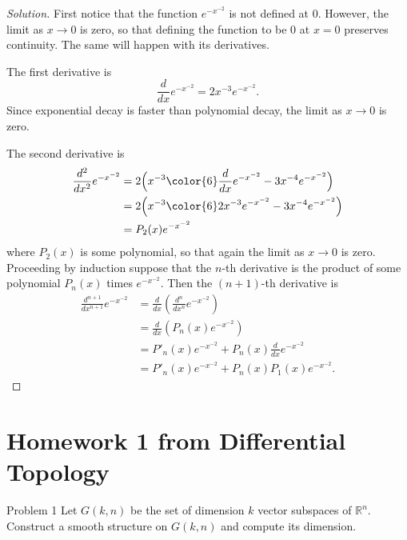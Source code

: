 \begin{proof}[Solution]\leavevmode
	First notice that the function \(e^{-x^{-2}}\) is not defined at 0. However, the limit as \(x \to 0\) is zero, so that defining the function to be 0 at \(x=0\) preserves continuity. The same will happen with its derivatives.

	The first derivative is
	\[\frac{d}{dx}e^{-x^{-2}}=2x^{-3}e^{-x^{-2}}.\]
Since exponential decay is faster than polynomial decay, the limit as \(x \to 0\) is zero.

	The second derivative is
\begin{align*}
	\frac{d^2}{dx^2}e^{-x^{-2}}&=2\Big(x^{-3}{\color{6}\frac{d}{dx}e^{-x^{-2}}}-3x^{-4}e^{-x^{-2}}\Big)\\
&=2\Big(x^{-3}{\color{6}2x^{-3}e^{-x^{-2}}}-3x^{-4}e^{-x^{-2}}\Big)\\
&=P_2(x)e^{-x^{-2}}
\end{align*}
where \(P_2(x)\) is some polynomial, so that again the limit as \(x \to 0\) is zero. Proceeding by induction suppose that the \(n\)-th derivative is the product of some polynomial \(P_n(x)\) times \(e^{-x^{-2}}\). Then the \((n+1)\)-th derivative is
\begin{align*}
	\frac{d^{n+1}}{dx^{n+1}}e^{-x^{-2}}&=\frac{d}{dx}\left(\frac{d^n}{dx^n}e^{-x^{-2}}\right)\\
&=\frac{d}{dx}\left(P_n(x)e^{-x^{-2}}\right)\\
&=P'_n(x)e^{-x^{-2}}+P_n(x)\frac{d}{dx}e^{-x^{-2}}\\
&=P'_n(x)e^{-x^{-2}}+P_n(x)P_1(x)e^{-x^{-2}}.
\end{align*}
\end{proof}

\section{Homework 1 from Differential Topology}

\begin{thing1}{Problem 1}\label{p:1}\leavevmode
Let \(G(k,n)\) be the set of dimension \(k\) vector subspaces of \(\mathbb{R}^n\). Construct a smooth structure on \(G(k,n)\) and compute its dimension.
\end{thing1}

